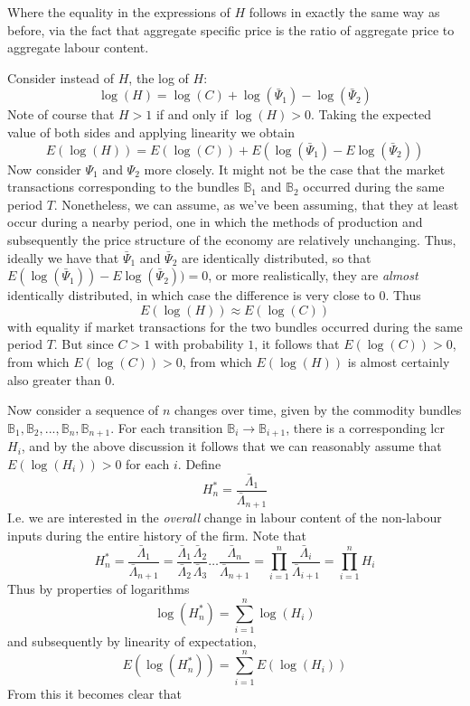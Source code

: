\documentclass{article}
\theoremstyle{definition}
\theoremstyle{plain}
\theoremstyle{theorem}
\begin{document}
Where the equality in the expressions of $H$ follows in exactly the same way as before, via the fact that aggregate specific price is the ratio of aggregate price to aggregate labour content. \par 
Consider instead of $H$, the log of $H$:
\[ \log(H) = \log(C) + \log(\bar{\Psi}_1) - \log(\bar{\Psi}_2) \]
Note of course that $H > 1$ if and only if $\log(H) > 0$. Taking the expected value of both sides and applying linearity we obtain
\[ E(\log(H)) = E(\log(C)) + E(\log(\bar{\Psi}_1) - E\log(\bar{\Psi}_2)) \]
Now consider $\Psi_1$ and $\Psi_2$ more closely. It might not be the case that the market transactions corresponding to the bundles $\mathbb{B}_1$ and $\mathbb{B}_2$ occurred during the same period $T$. Nonetheless, we can assume, as we've been assuming, that they at least occur during a nearby period, one in which the methods of production and subsequently the price structure of the economy are relatively unchanging. Thus, ideally we have that $\bar{\Psi}_1$ and $\bar{\Psi}_2$ are identically distributed, so that $E(\log(\bar{\Psi}_1)) - E\log(\bar{\Psi}_2)) = 0$, or more realistically, they are \textit{almost} identically distributed, in which case the difference is very close to $0$. Thus
\[ E(\log(H)) \approx E(\log(C)) \]
with equality if market transactions for the two bundles occurred during the same period $T$. But since $C > 1$ with probability $1$, it follows that $E(\log(C)) > 0$, from which $E(\log(C)) > 0$, from which $E(\log(H))$ is almost certainly also greater than $0$. \par 
Now consider a sequence of $n$ changes over time, given by the commodity bundles $\mathbb{B}_1,\mathbb{B}_2,...,\mathbb{B}_n,\mathbb{B}_{n+1}$. For each transition $\mathbb{B}_i \to \mathbb{B}_{i+1}$, there is a corresponding lcr $H_i$, and by the above discussion it follows that we can reasonably assume that $E(\log(H_i)) > 0$ for each $i$. Define 
\[ H^*_n = \frac{\bar{\Lambda}_1}{\bar{\Lambda}_{n+1}} \]
I.e. we are interested in the \textit{overall} change in labour content of the non-labour inputs during the entire history of the firm. Note that 
\[ H^*_n = \frac{\bar{\Lambda}_1}{\bar{\Lambda}_{n+1}} = \frac{\bar{\Lambda}_1}{\bar{\Lambda}_2}\frac{\bar{\Lambda}_2}{\bar{\Lambda}_3}\ldots \frac{\bar{\Lambda}_n}{\bar{\Lambda}_{n+1}} = \prod_{i=1}^n \frac{\bar{\Lambda}_i}{\bar{\Lambda}_{i+1}} = \prod_{i=1}^n H_i \]
Thus by properties of logarithms
\[ \log(H^*_n) = \sum_{i=1}^n \log(H_i) \]
and subsequently by linearity of expectation,
\[ E(\log(H^*_n)) = \sum_{i=1}^n E(\log(H_i)) \]
From this it becomes clear that 
\end{document}
